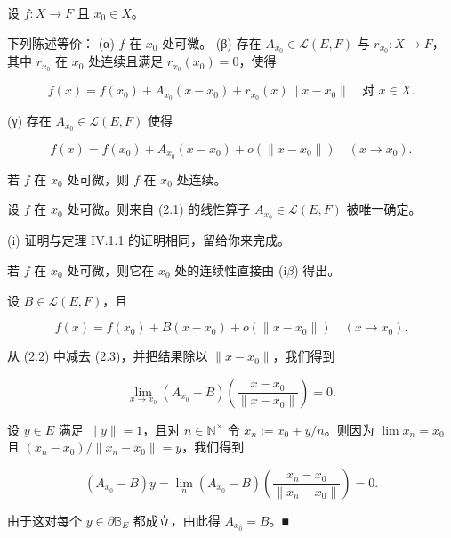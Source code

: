 \begin{proposition}

设 $ f : X \to F $ 且 $ x_0 \in X $。

\begin{subitems}
\item

下列陈述等价：
(α) $ f $ 在 $ x_0 $ 处可微。
(β) 存在 $ A_{x_0} \in \mathcal{L}(E, F) $ 与 $ r_{x_0} : X \to F $，其中 $ r_{x_0} $ 在 $ x_0 $ 处连续且满足 $ r_{x_0}(x_0) = 0 $，使得

\[
f(x) = f(x_0) + A_{x_0}(x - x_0) + r_{x_0}(x) \|x - x_0\| \quad \text{对 } x \in X .
\]

(γ) 存在 $ A_{x_0} \in \mathcal{L}(E, F) $ 使得

\begin{equation}
f(x) = f(x_0) + A_{x_0}(x - x_0) + o(\|x - x_0\|) \quad (x \to x_0) .\tag{2.2}
\end{equation}
\item

若 $ f $ 在 $ x_0 $ 处可微，则 $ f $ 在 $ x_0 $ 处连续。

\item

设 $ f $ 在 $ x_0 $ 处可微。则来自 (2.1) 的线性算子 $ A_{x_0} \in \mathcal{L}(E, F) $ 被唯一确定。

\proofhead
(i) 证明与定理 IV.1.1 的证明相同，留给你来完成。
\end{subitems}

\begin{subitems}
\item[（ii）]

若 $ f $ 在 $ x_0 $ 处可微，则它在 $ x_0 $ 处的连续性直接由 (i$ \beta $) 得出。

\item[（iii）]

设 $ B \in \mathcal{L}(E, F) $，且

\begin{equation}
f(x) = f(x_0) + B(x - x_0) + o(\|x - x_0\|) \quad (x \to x_0) .\tag{2.3}
\end{equation}

从 (2.2) 中减去 (2.3)，并把结果除以 $ \|x - x_0\| $，我们得到

\[
\lim_{x \to x_0} (A_{x_0} - B)\left( \frac{x - x_0}{\|x - x_0\|} \right) = 0 .
\]

设 $ y \in E $ 满足 $ \|y\| = 1 $，且对 $ n \in \mathbb{N}^{\times} $ 令 $ x_n := x_0 + y/n $。则因为 $ \lim x_n = x_0 $ 且 $ (x_n - x_0)/\|x_n - x_0\| = y $，我们得到

\[
(A_{x_0} - B)y = \lim_n (A_{x_0} - B)\left( \frac{x_n - x_0}{\|x_n - x_0\|} \right) = 0 .
\]

由于这对每个 $ y \in \partial\mathbb{B}_E $ 都成立，由此得 $ A_{x_0} = B $。\nobreak\hspace{0.35em}■

\end{subitems}

\end{proposition}


